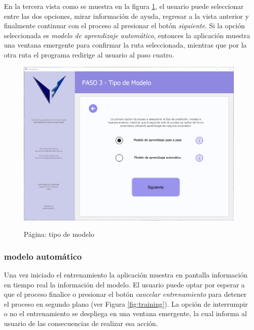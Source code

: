 En la tercera vista como se muestra en la figura \ref{fig:modeltype}, el usuario puede seleccionar entre las dos opciones, mirar información de ayuda, regresar a la vista anterior y finalmente continuar con el proceso al presionar el botón \textit{siguiente}. Si la opción seleccionada es \textit{modelo de aprendizaje automático}, entonces la aplicación muestra una ventana emergente para confirmar la ruta seleccionada, mientras que por la otra ruta el programa redirige al usuario al paso cuatro.

\begin{figure}[H]
    \centering
    \caption{Página: tipo de modelo}
    \includegraphics[width=\textwidth]{images/model.png}
    \label{fig:modeltype}
\end{figure}

\subsubsection{modelo automático}

Una vez iniciado el entrenamiento la aplicación muestra en pantalla información en tiempo real la información del modelo. El usuario puede optar por esperar a que el proceso finalice o presionar el botón \textit{cancelar entrenamiento} para detener el proceso en segundo plano (ver Figura \ref{fig:training}). La opción de interrumpir o no el entrenamiento se despliega en una ventana emergente, la cual informa al usuario de las consecuencias de realizar esa acción.

